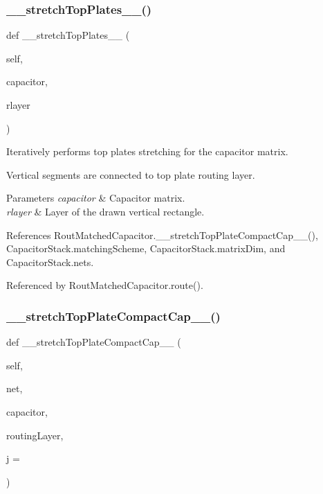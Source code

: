 \subsubsection{\texorpdfstring{\+\_\+\+\_\+stretch\+Top\+Plates\+\_\+\+\_\+()}{\_\_stretchTopPlates\_\_()}}
{\footnotesize\ttfamily def \+\_\+\+\_\+stretch\+Top\+Plates\+\_\+\+\_\+ (\begin{DoxyParamCaption}\item[{}]{self,  }\item[{}]{capacitor,  }\item[{}]{rlayer }\end{DoxyParamCaption})}



Iteratively performs top plates stretching for the capacitor matrix. 

Vertical segments are connected to top plate routing layer. 
\begin{DoxyParams}{Parameters}
{\em capacitor} & Capacitor matrix. \\
\hline
{\em rlayer} & Layer of the drawn vertical rectangle. \\
\hline
\end{DoxyParams}


References Rout\+Matched\+Capacitor.\+\_\+\+\_\+stretch\+Top\+Plate\+Compact\+Cap\+\_\+\+\_\+(), Capacitor\+Stack.\+matching\+Scheme, Capacitor\+Stack.\+matrix\+Dim, and Capacitor\+Stack.\+nets.



Referenced by Rout\+Matched\+Capacitor.\+route().

\mbox{\label{classpython_1_1capacitorrouted_1_1RoutMatchedCapacitor_adc7e5eab8f957ba5f80dd1e0d0ff1e50}} 
\subsubsection{\texorpdfstring{\+\_\+\+\_\+stretch\+Top\+Plate\+Compact\+Cap\+\_\+\+\_\+()}{\_\_stretchTopPlateCompactCap\_\_()}}
{\footnotesize\ttfamily def \+\_\+\+\_\+stretch\+Top\+Plate\+Compact\+Cap\+\_\+\+\_\+ (\begin{DoxyParamCaption}\item[{}]{self,  }\item[{}]{net,  }\item[{}]{capacitor,  }\item[{}]{routing\+Layer,  }\item[{}]{j = {} }\end{DoxyParamCaption})}



